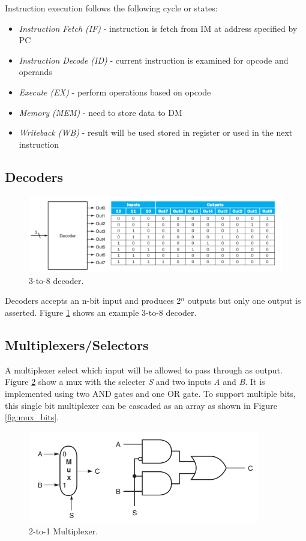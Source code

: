 \documentclass[a4paper, 11pt,oneside]{article}
\begin{document}
Instruction execution follows the following cycle or states:

\begin{itemize}
	\item {\textit{Instruction Fetch (IF)} - instruction is fetch from IM at address specified by PC}
	\item {\textit{Instruction Decode (ID)} - current instruction is examined for opcode and operands }
	\item {\textit{Execute (EX)} - perform operations based on opcode}
	\item {\textit{Memory (MEM)} - need to store data to DM}
	\item {\textit{Writeback (WB)} - result will be used stored in register or used in the next instruction}
\end{itemize}


\subsection{Decoders}
\begin{figure}
	\includegraphics[width=\linewidth]{decoder.png}
	\caption{3-to-8 decoder.}
	\label{fig:decoder} 
\end{figure}

Decoders accepts an n-bit input and produces 2$^n$  outputs but only one output is asserted. Figure \ref{fig:decoder} shows an example 3-to-8 decoder.

\subsection{Multiplexers/Selectors}
A multiplexer select which input will be allowed to pass through as output. Figure \ref{fig:mux} show a mux with the selecter \textit{S} and two inputs \textit{A} and \textit{B}. It is implemented using two AND gates and one OR gate. To support multiple bits, this single bit multiplexer can be cascaded as an array as shown in Figure \ref{fig:mux_bits}.

\begin{figure}
	\begin{center}
	\includegraphics[width=4in]{mux.png}
	\caption{2-to-1 Multiplexer.}
	\label{fig:mux} 
	\end{center}
\end{figure}
\end{document}
